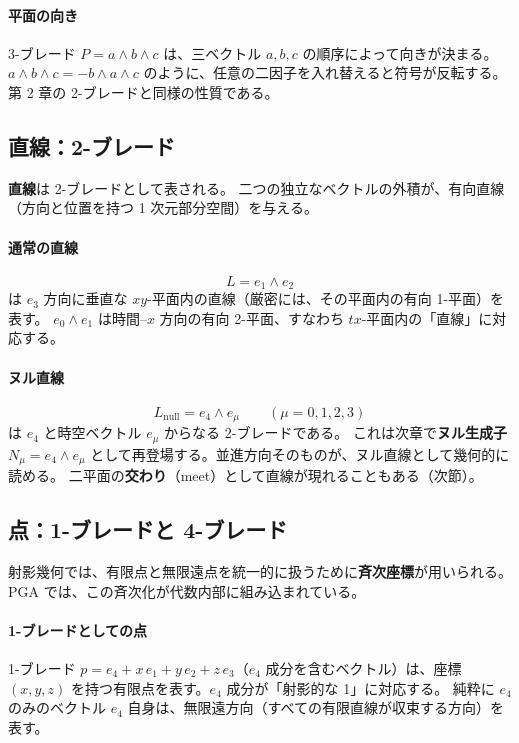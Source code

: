 \documentclass[dvipdfmx,a4paper,oneside]{jsbook}
\numberwithin{equation}{chapter}
\begin{document}
\paragraph{平面の向き}
3-ブレード \(P = a \wedge b \wedge c\) は、三ベクトル \(a,b,c\) の順序によって向きが決まる。
\(a \wedge b \wedge c = -b \wedge a \wedge c\) のように、任意の二因子を入れ替えると符号が反転する。第 2 章の 2-ブレードと同様の性質である。

\subsection{直線：2-ブレード}

\textbf{直線}は 2-ブレードとして表される。
二つの独立なベクトルの外積が、有向直線（方向と位置を持つ 1 次元部分空間）を与える。

\paragraph{通常の直線}
\begin{equation}
  L = e_1 \wedge e_2
  \label{eq:line-example}
\end{equation}
は \(e_3\) 方向に垂直な \(xy\)-平面内の直線（厳密には、その平面内の有向 1-平面）を表す。
\(e_0 \wedge e_1\) は時間–\(x\) 方向の有向 2-平面、すなわち \(tx\)-平面内の「直線」に対応する。

\paragraph{ヌル直線}
\begin{equation}
  L_{\mathrm{null}} = e_4 \wedge e_\mu \qquad (\mu = 0,1,2,3)
  \label{eq:line-null}
\end{equation}
は \(e_4\) と時空ベクトル \(e_\mu\) からなる 2-ブレードである。
これは次章で\textbf{ヌル生成子} \(N_\mu = e_4 \wedge e_\mu\) として再登場する。並進方向そのものが、ヌル直線として幾何的に読める。
二平面の\textbf{交わり}（meet）として直線が現れることもある（次節）。

\subsection{点：1-ブレードと 4-ブレード}

射影幾何では、有限点と無限遠点を統一的に扱うために\textbf{斉次座標}が用いられる。
PGA では、この斉次化が代数内部に組み込まれている。

\paragraph{1-ブレードとしての点}
1-ブレード \(p = e_4 + x\, e_1 + y\, e_2 + z\, e_3\)（\(e_4\) 成分を含むベクトル）は、座標 \((x,y,z)\) を持つ有限点を表す。\(e_4\) 成分が「射影的な 1」に対応する。
純粋に \(e_4\) のみのベクトル \(e_4\) 自身は、無限遠方向（すべての有限直線が収束する方向）を表す。
\end{document}
